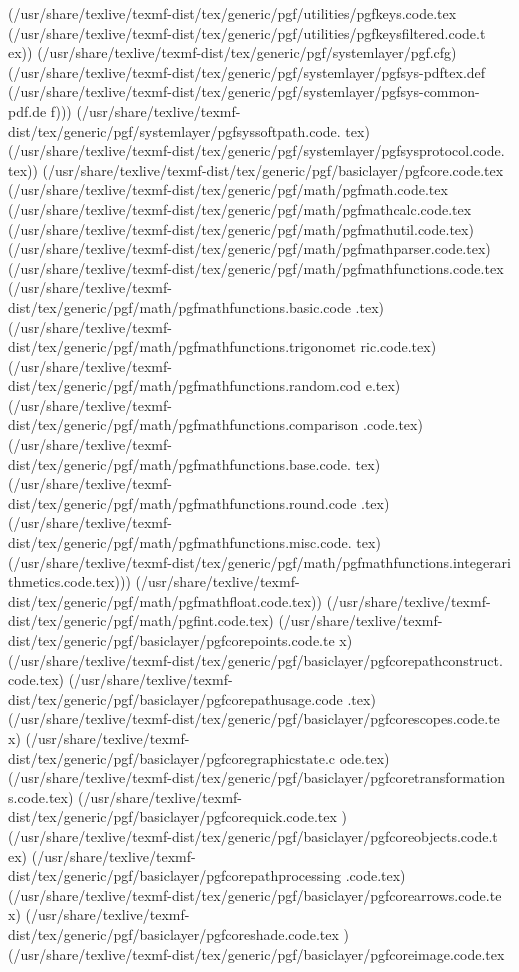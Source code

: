 (/usr/share/texlive/texmf-dist/tex/generic/pgf/utilities/pgfkeys.code.tex
(/usr/share/texlive/texmf-dist/tex/generic/pgf/utilities/pgfkeysfiltered.code.t
ex)) (/usr/share/texlive/texmf-dist/tex/generic/pgf/systemlayer/pgf.cfg)
(/usr/share/texlive/texmf-dist/tex/generic/pgf/systemlayer/pgfsys-pdftex.def
(/usr/share/texlive/texmf-dist/tex/generic/pgf/systemlayer/pgfsys-common-pdf.de
f)))
(/usr/share/texlive/texmf-dist/tex/generic/pgf/systemlayer/pgfsyssoftpath.code.
tex)
(/usr/share/texlive/texmf-dist/tex/generic/pgf/systemlayer/pgfsysprotocol.code.
tex))
(/usr/share/texlive/texmf-dist/tex/generic/pgf/basiclayer/pgfcore.code.tex
(/usr/share/texlive/texmf-dist/tex/generic/pgf/math/pgfmath.code.tex
(/usr/share/texlive/texmf-dist/tex/generic/pgf/math/pgfmathcalc.code.tex
(/usr/share/texlive/texmf-dist/tex/generic/pgf/math/pgfmathutil.code.tex)
(/usr/share/texlive/texmf-dist/tex/generic/pgf/math/pgfmathparser.code.tex)
(/usr/share/texlive/texmf-dist/tex/generic/pgf/math/pgfmathfunctions.code.tex
(/usr/share/texlive/texmf-dist/tex/generic/pgf/math/pgfmathfunctions.basic.code
.tex)
(/usr/share/texlive/texmf-dist/tex/generic/pgf/math/pgfmathfunctions.trigonomet
ric.code.tex)
(/usr/share/texlive/texmf-dist/tex/generic/pgf/math/pgfmathfunctions.random.cod
e.tex)
(/usr/share/texlive/texmf-dist/tex/generic/pgf/math/pgfmathfunctions.comparison
.code.tex)
(/usr/share/texlive/texmf-dist/tex/generic/pgf/math/pgfmathfunctions.base.code.
tex)
(/usr/share/texlive/texmf-dist/tex/generic/pgf/math/pgfmathfunctions.round.code
.tex)
(/usr/share/texlive/texmf-dist/tex/generic/pgf/math/pgfmathfunctions.misc.code.
tex)
(/usr/share/texlive/texmf-dist/tex/generic/pgf/math/pgfmathfunctions.integerari
thmetics.code.tex)))
(/usr/share/texlive/texmf-dist/tex/generic/pgf/math/pgfmathfloat.code.tex))
(/usr/share/texlive/texmf-dist/tex/generic/pgf/math/pgfint.code.tex)
(/usr/share/texlive/texmf-dist/tex/generic/pgf/basiclayer/pgfcorepoints.code.te
x)
(/usr/share/texlive/texmf-dist/tex/generic/pgf/basiclayer/pgfcorepathconstruct.
code.tex)
(/usr/share/texlive/texmf-dist/tex/generic/pgf/basiclayer/pgfcorepathusage.code
.tex)
(/usr/share/texlive/texmf-dist/tex/generic/pgf/basiclayer/pgfcorescopes.code.te
x)
(/usr/share/texlive/texmf-dist/tex/generic/pgf/basiclayer/pgfcoregraphicstate.c
ode.tex)
(/usr/share/texlive/texmf-dist/tex/generic/pgf/basiclayer/pgfcoretransformation
s.code.tex)
(/usr/share/texlive/texmf-dist/tex/generic/pgf/basiclayer/pgfcorequick.code.tex
)
(/usr/share/texlive/texmf-dist/tex/generic/pgf/basiclayer/pgfcoreobjects.code.t
ex)
(/usr/share/texlive/texmf-dist/tex/generic/pgf/basiclayer/pgfcorepathprocessing
.code.tex)
(/usr/share/texlive/texmf-dist/tex/generic/pgf/basiclayer/pgfcorearrows.code.te
x)
(/usr/share/texlive/texmf-dist/tex/generic/pgf/basiclayer/pgfcoreshade.code.tex
)
(/usr/share/texlive/texmf-dist/tex/generic/pgf/basiclayer/pgfcoreimage.code.tex

